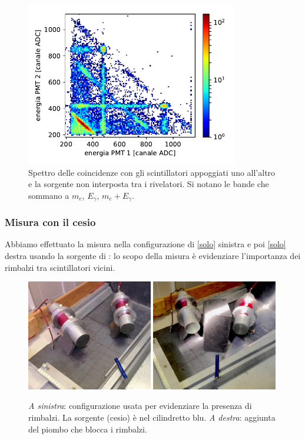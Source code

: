 \begin{figure}
	\centering
	\includegraphics[width=25em]{immagini/attaccati}
	\caption{\label{fig:attaccati}
	Spettro delle coincidenze con gli scintillatori appoggiati uno all'altro
	e la sorgente non interposta tra i rivelatori.
	Si notano le bande che sommano a $m_e$, $E_\gamma$, $m_e+E_\gamma$.}
\end{figure}

\subsubsection{Misura con il cesio}

Abbiamo effettuato la misura nella configurazione di \autoref{solo} sinistra e poi \autoref{solo} destra usando la sorgente di \cs{}: lo scopo della misura è evidenziare l'importanza dei rimbalzi tra scintillatori vicini.

\begin{figure}[h]
\centering
\subfloat
{\includegraphics[width=0.49\textwidth]{immagini/rimb.jpg}}
\hfill
\subfloat
{\includegraphics[width=0.49\textwidth]{immagini/norimb}}
\caption{\label{solo}
\emph{A sinistra}:
configurazione usata per evidenziare la presenza di rimbalzi.
La sorgente (cesio) è nel cilindretto blu.
\emph{A destra}:
aggiunta del piombo che blocca i rimbalzi.}
\end{figure}

